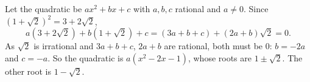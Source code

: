 Let the quadratic be $ax^2+bx+c$ with $a,b,c$ rational and $a\ne0$. Since $(1+\sqrt2)^2=3+2\sqrt2$,
\[
a(3+2\sqrt2)+b(1+\sqrt2)+c=(3a+b+c)+(2a+b)\sqrt2=0 .
\]
As $\sqrt2$ is irrational and $3a+b+c$, $2a+b$ are rational, both must be $0$: $b=-2a$ and $c=-a$. So the quadratic is $a(x^2-2x-1)$, whose roots are $1\pm\sqrt2$. The other root is $\boxed{1-\sqrt2}$.
